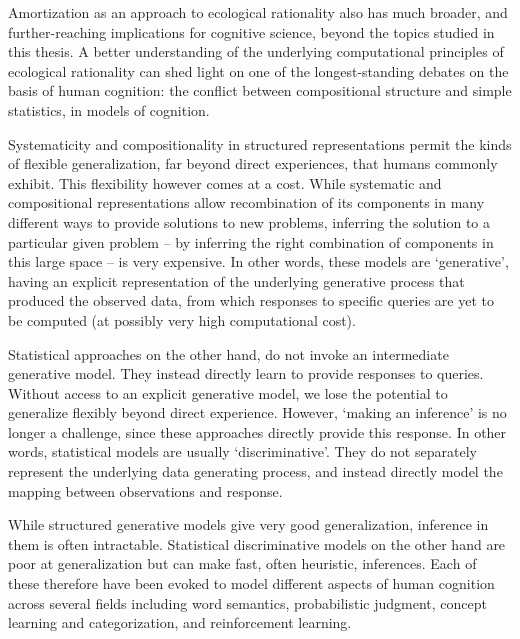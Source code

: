 Amortization as an approach to ecological rationality also has much broader, and further-reaching implications for cognitive science, beyond the topics studied in this thesis. A better understanding of the underlying computational principles of ecological rationality can shed light on one of the longest-standing debates on the basis of human cognition: the conflict between compositional structure and simple statistics, in models of cognition.

Systematicity and compositionality\citep{fodor88} in structured representations permit the kinds of flexible generalization, far beyond direct experiences, that humans commonly exhibit. \citep{griffiths2006, shepard1987toward, wu2018generalization, schulz2017compositional}%
This flexibility however comes at a cost. While systematic and compositional representations allow recombination of its components in many different ways to provide solutions to new problems, inferring the solution to a particular given problem – by inferring the right combination of components in this large space – is very expensive. In other words, these models are `generative', having an explicit representation of the underlying generative process that produced the observed data, from which responses to specific queries are yet to be computed (at possibly very high computational cost).

Statistical approaches on the other hand, do not invoke an intermediate generative model. They instead directly learn to provide responses to queries. Without access to an explicit generative model, we lose the potential to generalize flexibly beyond direct experience. However, `making an inference' is no longer a challenge, since these approaches directly provide this response. In other words, statistical models are usually `discriminative'. They do not separately represent the underlying data generating process, and instead directly model the mapping between observations and response.

While structured generative models give very good generalization, inference in them is often intractable. Statistical discriminative models on the other hand are poor at generalization but can make fast, often heuristic, inferences. Each of these therefore have been evoked to model different aspects of human cognition across several fields including word semantics\cite{steyvers2007probabilistic, rogers2004semantic, gleitman1990structural}, probabilistic judgment\citep{oaksford2007bayesian, tversky1974judgment}, concept learning and categorization\citep{bruner2017study, medin1978context, shepard1987toward}, and reinforcement learning\citep{gershman2014retrospective, daw2011model, kool2017cost}. 

